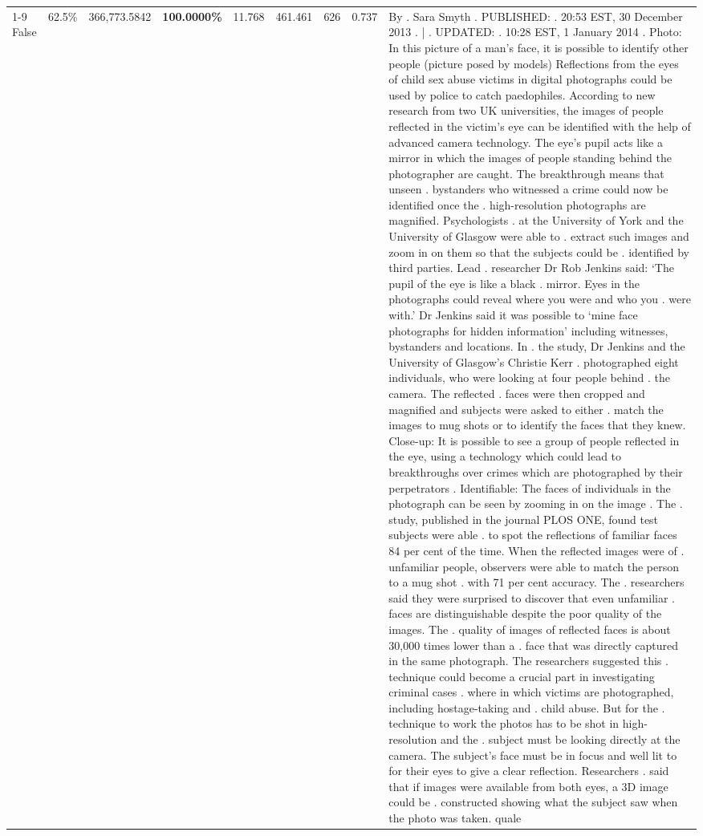 \begin{table}[H]
\begin{tabular}{lllrlllll}
\cline{1-9}
False & 62.5\% & 366,773.5842 & \bfseries \color{red} 100.0000\% & 11.768 & 461.461 & 626 & 0.737 & By . Sara Smyth . PUBLISHED: . 20:53 EST, 30 December 2013 . | . UPDATED: . 10:28 EST, 1 January 2014 . Photo: In this picture of a man's face, it is possible to identify other people (picture posed by models) Reflections from the eyes of child sex abuse victims in digital photographs could be used by police to catch paedophiles. According to new research from two UK universities, the images of people reflected in the victim's eye can be identified with the help of advanced camera technology. The eye's pupil acts like a mirror in which the images of people standing behind the photographer are caught. The breakthrough means that unseen . bystanders who witnessed a crime could now be identified once the . high-resolution photographs are magnified. Psychologists . at the University of York and the University of Glasgow were able to . extract such images and zoom in on them so that the subjects could be . identified by third parties. Lead . researcher Dr Rob Jenkins said: ‘The pupil of the eye is like a black . mirror. Eyes in the photographs could reveal where you were and who you . were with.' Dr Jenkins said it was possible to ‘mine face photographs for hidden information' including witnesses, bystanders and locations. In . the study, Dr Jenkins and the University of Glasgow's Christie Kerr . photographed eight individuals, who were looking at four people behind . the camera. The reflected . faces were then cropped and magnified and subjects were asked to either . match the images to mug shots or to identify the faces that they knew. Close-up: It is possible to see a group of people reflected in the eye, using a technology which could lead to breakthroughs over crimes which are photographed by their perpetrators . Identifiable: The faces of individuals in the photograph can be seen by zooming in on the image . The . study, published in the journal PLOS ONE, found test subjects were able . to spot the reflections of familiar faces 84 per cent of the time. When the reflected images were of . unfamiliar people, observers were able to match the person to a mug shot . with 71 per cent accuracy. The . researchers said they were surprised to discover that even unfamiliar . faces are distinguishable despite the poor quality of the images. The . quality of images of reflected faces is about 30,000 times lower than a . face that was directly captured in the same photograph. The researchers suggested this . technique could become a crucial part in investigating criminal cases . where in which victims are photographed, including hostage-taking and . child abuse. But for the . technique to work the photos has to be shot in high-resolution and the . subject must be looking directly at the camera. The subject's face must be in focus and well lit to for their eyes to give a clear reflection. Researchers . said that if images were available from both eyes, a 3D image could be . constructed showing what the subject saw when the photo was taken. quale \\

\end{tabular}
\end{table}
